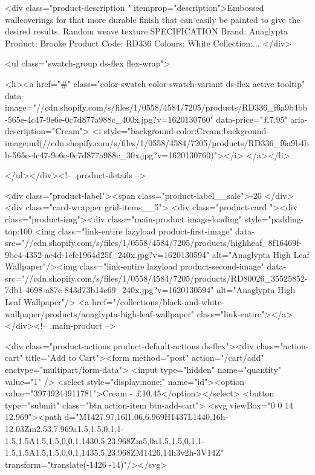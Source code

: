 {{{{{{{<div class="product-description " itemprop="description">Embossed wallcoverings for that more durable finish that can easily be painted to give the desired results. Random weave texture.SPECIFICATION Brand: Anaglypta Product: Brooke Product Code: RD336 Colours: White Collection:...
</div>



<ul class="swatch-group ds-flex flex-wrap">
        
<li><a href="#" class="color-swatch color-swatch-variant ds-flex active tooltip" data-image="//cdn.shopify.com/s/files/1/0558/4584/7205/products/RD336_f6a9b4bb-565e-4c47-9e6e-0c7d877a988c_400x.jpg?v=1620130760" data-price="£7.95" aria-description="Cream">
              <i style="background-color:Cream;background-image:url(//cdn.shopify.com/s/files/1/0558/4584/7205/products/RD336_f6a9b4bb-565e-4c47-9e6e-0c7d877a988c_30x.jpg?v=1620130760)"></i>
            </a></li>

      </ul></div><!-- .product-details -->

<div class="product-label"><span class="product-label__sale">-20%
          </div><div class="card-wrapper grid-items__5">
            <div class="product-card "><div class="product-img"><div class="main-product image-loading" style="padding-top:100%
      <img class="link-entire lazyload product-first-image" data-src="//cdn.shopify.com/s/files/1/0558/4584/7205/products/highheaf_8f16469f-9bc4-4352-ae4d-1efc1964d25f_240x.jpg?v=1620130594" alt="Anaglypta High Leaf Wallpaper"/><img class="link-entire lazyload product-second-image" data-src="//cdn.shopify.com/s/files/1/0558/4584/7205/products/RD80026_35525852-7db1-4698-a87c-843d73b14c69_240x.jpg?v=1620130594" alt="Anaglypta High Leaf Wallpaper"/>
      <a href="/collections/black-and-white-wallpaper/products/anaglypta-high-leaf-wallpaper" class="link-entire"></a>
    </div><!-- .main-product -->
  
<div class="product-actions product-default-actions ds-flex"><div class="action-cart" title="Add to Cart"><form method="post" action="/cart/add" enctype="multipart/form-data">
            <input type="hidden" name="quantity" value="1" />
            <select style="display:none;" name="id"><option value="39749244911781">Cream - £10.45</option></select>
            <button type="submit" class="btn action-item btn-add-cart">
              <svg viewBox="0 0 14 12.969"><path d="M1427.97,16l1.06,6.969H1437L1440,16h-12.03Zm2.53,7.969a1.5,1.5,0,1,1-1.5,1.5A1.5,1.5,0,0,1,1430.5,23.968Zm5,0a1.5,1.5,0,1,1-1.5,1.5A1.5,1.5,0,0,1,1435.5,23.968ZM1426,14h3v2h-3V14Z" transform="translate(-1426 -14)"/></svg>

}}}}}}}
